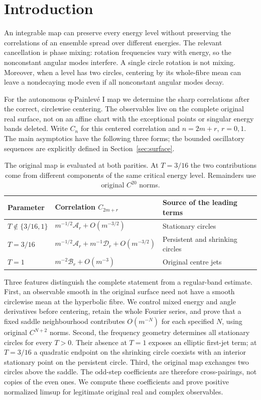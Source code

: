 \section{Introduction}
\label{sec:introduction}

An integrable map can preserve every energy level without preserving
the correlations of an ensemble spread over different energies.
The relevant cancellation is phase mixing: rotation frequencies vary
with energy, so the nonconstant angular modes interfere. A single
circle rotation is not mixing. Moreover, when a level has two circles,
centering by its whole-fibre mean can leave a nondecaying mode even
if all nonconstant angular modes decay.

For the autonomous q-Painlev\'e I map we determine the sharp
correlations after the correct, circlewise centering. The observables
live on the complete original real surface, not on an affine chart
with the exceptional points or singular energy bands deleted.
Write $C_n$ for this centered correlation and $n=2m+r$, $r=0,1$.
The main asymptotics have the following three forms; the bounded
oscillatory sequences are explicitly defined in
Section~\ref{sec:surface}.
\begin{table}[htbp]
\centering
\begin{tabular}{@{}lll@{}}
\toprule
Parameter & Correlation $C_{2m+r}$ & Source of the leading terms\\
\midrule
$T\notin\{3/16,1\}$ & $m^{-1/2}\mathcal A_r+O(m^{-3/2})$
 & Stationary circles\\
$T=3/16$ & $m^{-1/2}\mathcal A_r+m^{-1}\mathcal D_r+O(m^{-3/2})$
 & Persistent and shrinking circles\\
$T=1$ & $m^{-2}\mathcal B_r+O(m^{-3})$
 & Original centre jets\\
\bottomrule
\end{tabular}
\caption{The original map is evaluated at both parities. At $T=3/16$
the two contributions come from different components of the same
critical energy level. Remainders use original $C^{20}$ norms.}
\label{intro:rates}
\end{table}

Three features distinguish the complete statement from a regular-band
estimate. First, an observable smooth in the original surface need
not have a smooth circlewise mean at the hyperbolic fibre. We control
mixed energy and angle derivatives before centering, retain the whole
Fourier series, and prove that a fixed saddle neighbourhood contributes
$O(m^{-N})$ for each specified $N$, using original $C^{N+2}$ norms.
Second, the frequency geometry determines all stationary circles for
every $T>0$. Their absence at $T=1$ exposes an elliptic first-jet term;
at $T=3/16$ a quadratic endpoint on the shrinking circle coexists
with an interior stationary point on the persistent circle. Third,
the original map exchanges two circles above the saddle. The odd-step
coefficients are therefore cross-pairings, not copies of the even ones.
We compute these coefficients and prove positive normalized limsup
for legitimate original real and complex observables.

